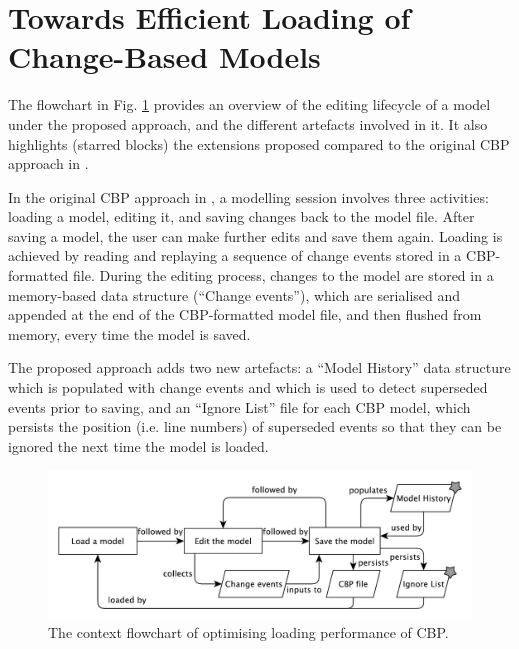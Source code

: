 \documentclass{llncs}
\begin{document}

\section{Towards Efficient Loading of Change-Based Models}
\label{sec:loading_time_optimisation}
The flowchart in Fig. \ref{fig:flowchart} provides an overview of the editing lifecycle of a model under the proposed approach, and the different artefacts involved in it. It also highlights (starred blocks) the extensions proposed compared to the original CBP approach in \cite{yohannis2017turning}.

In the original CBP approach in \cite{yohannis2017turning}, a modelling session involves three activities: loading a model, editing it, and saving changes back to the model file. After saving a model, the user can make further edits and save them again. Loading is achieved by reading and replaying a sequence of change events stored in a CBP-formatted file. During the editing process, changes to the model are stored in a memory-based data structure (``Change events''), which are serialised and appended at the end of the CBP-formatted model file, and then flushed from memory, every time the model is saved.

The proposed approach adds two new artefacts: a ``Model History'' data structure which is populated with change events and which is used to detect superseded events prior to saving, and an ``Ignore List'' file for each CBP model, which persists the position (i.e. line numbers) of superseded events so that they can be ignored the next time the model is loaded.


\begin{figure}[ht]
\centering
\includegraphics[width=\linewidth]{flowchart}
\caption{The context flowchart of optimising loading performance of CBP.}
\label{fig:flowchart}
\end{figure}
\end{document}
